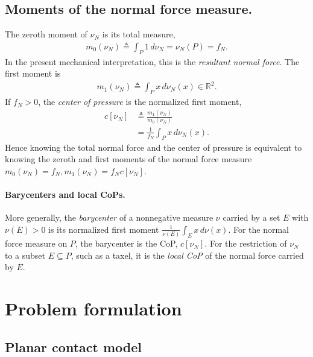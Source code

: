 \documentclass[11pt,a4paper]{article}
\theoremstyle{plain}
\begin{document}
\subsection{Moments of the normal force measure.}
The zeroth moment of $\nu_N$ is its total measure,
\begin{align}
m_0(\nu_N) \triangleq \int_P 1\,d\nu_N = \nu_N(P) = f_N.
\end{align}
In the present mechanical interpretation, this is the \textit{resultant normal force}. The first moment is
\begin{align}
m_1(\nu_N) \triangleq \int_P x\,d\nu_N(x)\in\mathbb R^2.
\end{align}
If $f_N>0$, the \textit{center of pressure} is the normalized first moment, 
\begin{align} 
c[\nu_N] &\triangleq \frac{m_1(\nu_N)}{m_0(\nu_N)} \\
         & = \frac{1}{f_N} \int_P x\,d\nu_N(x).
\end{align}
Hence knowing the total normal force and the center of pressure is equivalent to knowing the zeroth and first moments of the normal force measure $m_0(\nu_N)=f_N, m_1(\nu_N)=f_Nc[\nu_N]$. 

\paragraph{Barycenters and local CoPs.}
More generally, the \textit{barycenter} of a nonnegative measure $\nu$ carried by a set $E$ with $\nu(E)>0$ is its normalized first moment
$\frac{1}{\nu(E)}\int_E x\,d\nu(x)$. For the normal force measure on $P$, the barycenter is the CoP, $c[\nu_N]$. For the restriction of $\nu_N$ to a
subset $E\subseteq P$, such as a taxel, it is the \textit{local CoP} of the normal force carried by $E$.

\section{Problem formulation}
\subsection{Planar contact model}
\end{document}
